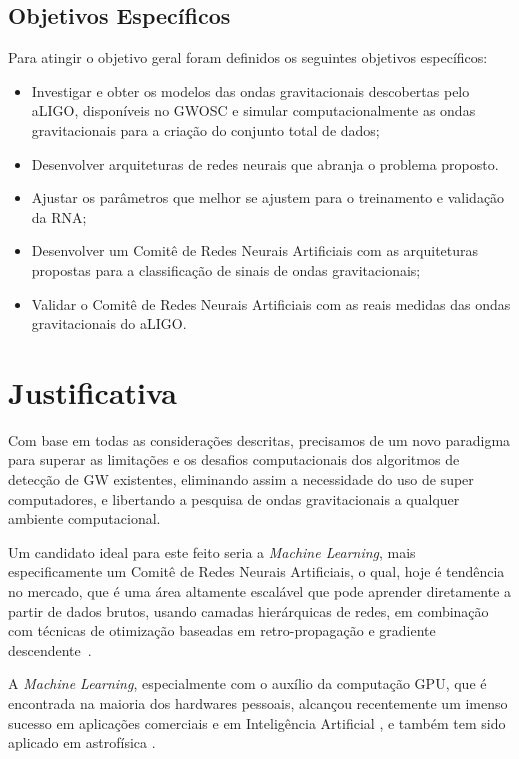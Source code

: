 \subsection{Objetivos Específicos}
Para atingir o objetivo geral foram definidos os seguintes objetivos específicos: 
\begin{itemize}

\item Investigar e obter os modelos das ondas gravitacionais descobertas pelo aLIGO, disponíveis no GWOSC \cite{vallisneri2015ligo} e simular computacionalmente as ondas gravitacionais para a criação do conjunto total de dados;
\item Desenvolver arquiteturas de redes neurais que abranja o problema proposto.
\item Ajustar os parâmetros que melhor se ajustem para o treinamento e validação da RNA;
\item Desenvolver um Comitê de Redes Neurais Artificiais com as arquiteturas propostas para a classificação de sinais de ondas gravitacionais;
\item Validar o Comitê de Redes Neurais Artificiais com as reais medidas das ondas gravitacionais do aLIGO.

\end{itemize}
\section{Justificativa}

Com base em todas as considerações descritas, precisamos de um novo paradigma para superar as limitações e os desafios computacionais dos algoritmos de detecção de GW existentes, eliminando assim a necessidade do uso de super computadores, e libertando a pesquisa de ondas gravitacionais a qualquer ambiente computacional.

Um candidato ideal para este feito seria a \textit{Machine Learning}, mais especificamente um Comitê de Redes Neurais Artificiais, o qual, hoje é tendência no mercado, que é uma área  altamente escalável que pode aprender diretamente a partir de dados brutos, usando camadas hierárquicas de redes, em combinação com técnicas de otimização baseadas em retro-propagação e gradiente descendente~\cite{barca2005treinamento}. 

A \textit{Machine Learning}, especialmente com o auxílio da computação GPU, que é encontrada na maioria dos hardwares pessoais, alcançou recentemente um imenso sucesso em aplicações comerciais e em Inteligência Artificial \cite{esteva2017dermatologist, moravvcik2017deepstack, van2016wavenet, 10.1007/978-3-319-44188-7_16}, e também tem sido aplicado em astrofísica \cite{shen2017denoising,PhysRevLett.120.141103,krastev2019real,gebhard2019convolutional,mukund2017transient,kim2015application,george2018deep,george2017glitch, george2017deepA}.

